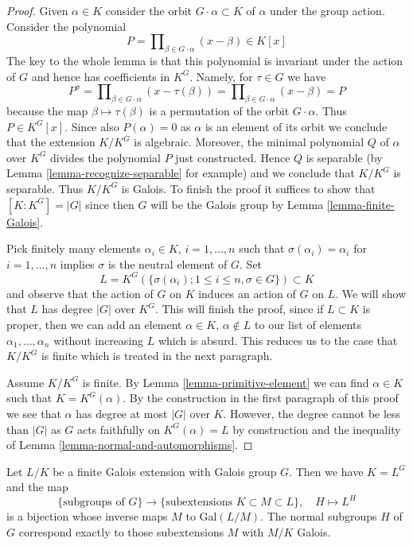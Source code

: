 \begin{proof}
Given $\alpha \in K$ consider the orbit $G \cdot \alpha \subset K$
of $\alpha$ under the group action. Consider the polynomial
$$
P = \prod\nolimits_{\beta \in G \cdot \alpha} (x - \beta) \in K[x]
$$
The key to the whole lemma is that this polynomial is invariant
under the action of $G$ and hence has coefficients in $K^G$.
Namely, for $\tau \in G$ we have
$$
P^\sigma = \prod\nolimits_{\beta \in G \cdot \alpha} (x - \tau(\beta)) =
\prod\nolimits_{\beta \in G \cdot \alpha} (x - \beta) = P
$$
because the map $\beta \mapsto \tau(\beta)$ is a permutation of
the orbit $G \cdot \alpha$. Thus $P \in K^G[x]$. Since also
$P(\alpha) = 0$ as $\alpha$ is an element of its orbit
we conclude that the extension $K/K^G$ is algebraic. Moreover,
the minimal polynomial $Q$ of $\alpha$ over $K^G$ divides the
polynomial $P$ just constructed. Hence $Q$ is separable
(by Lemma \ref{lemma-recognize-separable} for example) and
we conclude that $K/K^G$ is separable. Thus $K/K^G$ is Galois.
To finish the proof it suffices to show that $[K : K^G] = |G|$
since then $G$ will be the Galois group by
Lemma \ref{lemma-finite-Galois}.

\medskip\noindent
Pick finitely many elements $\alpha_i \in K$, $i = 1, \ldots, n$
such that $\sigma(\alpha_i) = \alpha_i$ for $i = 1, \ldots, n$ implies
$\sigma$ is the neutral element of $G$. Set
$$
L = K^G(\{\sigma(\alpha_i); 1 \leq i \leq n, \sigma \in G\}) \subset K
$$
and observe that the action of $G$ on $K$ induces an action of $G$ on $L$.
We will show that $L$ has degree $|G|$ over $K^G$. This will finish the
proof, since if $L \subset K$ is proper, then we can add an element
$\alpha \in K$, $\alpha \not \in L$ to our list of elements
$\alpha_1, \ldots, \alpha_n$ without increasing $L$ which is absurd.
This reduces us to the case that $K/K^G$ is finite which is
treated in the next paragraph.

\medskip\noindent
Assume $K/K^G$ is finite. By Lemma \ref{lemma-primitive-element}
we can find $\alpha \in K$ such that $K = K^G(\alpha)$.
By the construction in the first paragraph of this proof we see
that $\alpha$ has degree at most $|G|$ over $K$. However, the
degree cannot be less than $|G|$ as $G$ acts faithfully on
$K^G(\alpha) = L$ by construction and the inequality of
Lemma \ref{lemma-normal-and-automorphisms}.
\end{proof}

\begin{theorem}
\label{theorem-galois-theory}
Let $L/K$ be a finite Galois extension with Galois group $G$.
Then we have $K = L^G$ and the map
$$
\{\text{subgroups of }G\}
\longrightarrow
\{\text{subextensions }K \subset M \subset L\},\quad
H \longmapsto L^H
$$
is a bijection whose inverse maps $M$ to $\text{Gal}(L/M)$.
The normal subgroups $H$ of $G$ correspond exactly to those
subextensions $M$ with $M/K$ Galois.
\end{theorem}

